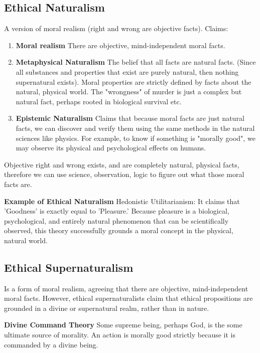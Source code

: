 \documentclass[12pt]{article}
\begin{document}
\subsection{Ethical Naturalism}
A version of moral realism (right and wrong are objective facts).
Claims:
\begin{enumerate}
    \item \textbf{Moral realism} There are objective, mind-independent moral facts.
    \item \textbf{Metaphysical Naturalism} The belief that all facts are natural facts.
    (Since all substances and properties that exist are purely natural, then nothing supernatural exists).
    Moral properties are strictly defined by facts about the natural, physical world.
    The "wrongness" of murder is just a complex but natural fact, perhaps rooted in biological survival etc.
    \item \textbf{Epistemic Naturalism} Claims that because moral facts are just natural facts,
    we can discover and verify them using the same methods in the natural sciences like physics.
    For example, to know if something is "morally good", we may observe its physical and psychological effects on humans.
\end{enumerate}
Objective right and wrong exists, and are completely natural, physical facts, therefore we can use science, observation, logic to figure out what those moral facts are.

\vspace{1em}
\noindent\textbf{Example of Ethical Naturalism} Hedonistic Utilitarianism: It claims that 'Goodness' is exactly equal to 'Pleasure.'
Because pleasure is a biological, psychological, and entirely natural phenomenon that can be scientifically observed, this theory successfully grounds a moral concept in the physical, natural world.

\subsection{Ethical Supernaturalism}
Is a form of moral realism, agreeing that there are objective, mind-independent moral facts.
However, ethical supernaturalists claim that ethical propositions are grounded in a divine or supernatural realm, rather than in nature.

\textbf{Divine Command Theory} Some supreme being, perhaps God, is the some ultimate source of morality. An action is morally good strictly because it is commanded by a divine being.
\end{document}
